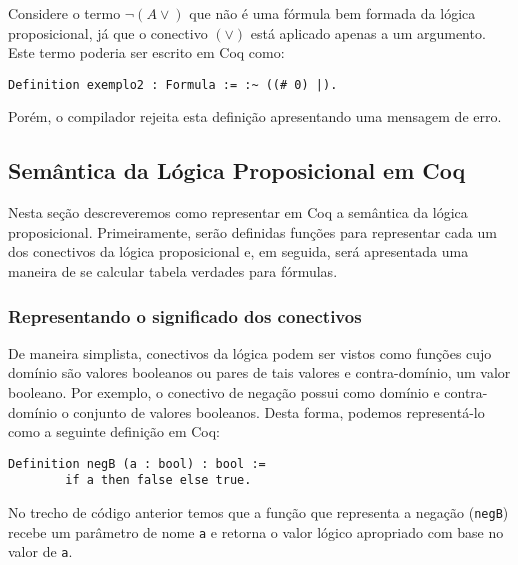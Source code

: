 \begin{Example}
Considere o termo $\neg (A \lor)$ que não é uma fórmula bem formada da
lógica proposicional, já que o conectivo $(\lor)$ está aplicado apenas
a um argumento. Este termo poderia ser escrito em Coq como:
\begin{lstlisting}
Definition exemplo2 : Formula := :~ ((# 0) |).
\end{lstlisting}
Porém, o compilador rejeita esta definição apresentando uma mensagem
de erro.
\end{Example}

\subsection{Semântica da Lógica Proposicional em Coq}

Nesta seção descreveremos como representar em Coq a semântica da
lógica proposicional. Primeiramente, serão definidas funções para
representar cada um dos conectivos da lógica proposicional e, em
seguida, será apresentada uma maneira de se calcular tabela verdades
para fórmulas.

\subsubsection{Representando o significado dos conectivos}\label{conectivoscoq}

De maneira simplista, conectivos da lógica podem ser vistos como
funções cujo domínio são valores booleanos ou pares de tais valores e
contra-domínio, um valor booleano. Por exemplo, o conectivo de negação
possui como domínio e contra-domínio o conjunto de valores
booleanos. Desta forma, podemos representá-lo como a seguinte
definição em Coq:
\begin{lstlisting}
Definition negB (a : bool) : bool :=
        if a then false else true.
\end{lstlisting}
No trecho de código anterior temos que a função que representa a
negação (\texttt{negB}) recebe um parâmetro de nome \texttt{a} e
retorna o valor lógico apropriado com base no valor de \texttt{a}.

